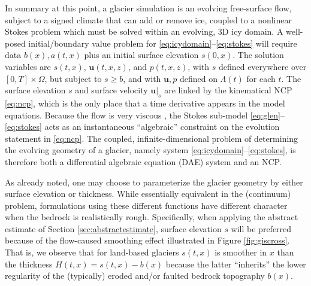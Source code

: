 \documentclass[hidelinks,onefignum,onetabnum,final]{siamart220329}  %
\newcommand{\bu}{\mathbf{u}}
\begin{document}
In summary at this point, a glacier simulation is an evolving free-surface flow, subject to a signed climate that can add or remove ice, coupled to a nonlinear Stokes problem which must be solved within an evolving, 3D icy domain.  A well-posed initial/boundary value problem for \eqref{eq:icydomain}--\eqref{eq:stokes} will require data $b(x),a(t,x)$ plus an initial surface elevation $s(0,x)$.  The solution variables are $s(t,x)$, $\bu(t,x,z)$, and $p(t,x,z)$, with $s$ defined everywhere over $[0,T]\times \Omega$, but subject to $s \ge b$, and with $\bu,p$ defined on $\Lambda(t)$ for each $t$.  The surface elevation $s$ and surface velocity $\bu|_s$ are linked by the kinematical NCP \eqref{eq:ncp}, which is the only place that a time derivative appears in the model equations.  Because the flow is very viscous \cite{Acheson1990}, the Stokes sub-model \eqref{eq:glen}--\eqref{eq:stokes} acts as an instantaneous ``algebraic'' constraint on the evolution statement in \eqref{eq:ncp}.  The coupled, infinite-dimensional problem of determining the evolving geometry of a glacier, namely system \eqref{eq:icydomain}--\eqref{eq:stokes}, is therefore both a differential algebraic equation (DAE) system \cite{AscherPetzold1998,LofgrenAhlkronaHelanow2022} and an NCP.

As already noted, one may choose to parameterize the glacier geometry by either surface elevation or thickness.  While essentially equivalent in the (continuum) problem, formulations using these different functions have different character when the bedrock is realistically rough.  Specifically, when applying the abstract estimate of Section \ref{sec:abstractestimate}, surface elevation $s$ will be preferred because of the flow-caused smoothing effect illustrated in Figure \ref{fig:giscross}.  That is, we observe that for land-based glaciers $s(t,x)$ is smoother in $x$ than the thickness $H(t,x) = s(t,x)-b(x)$ because the latter ``inherits'' the lower regularity of the (typically) eroded and/or faulted bedrock topography $b(x)$.
\end{document}
